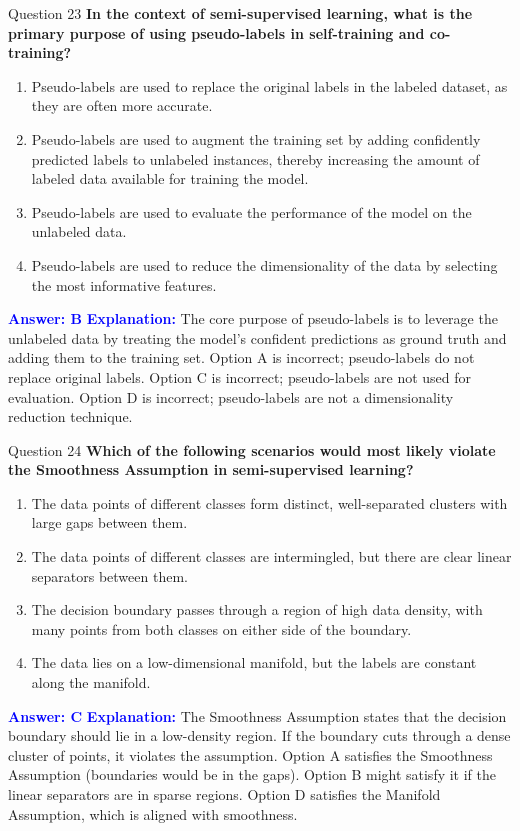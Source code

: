 \documentclass[8pt]{beamer}  %
\begin{document}
	\begin{frame}{Question 23}
		\textbf{In the context of semi-supervised learning, what is the primary purpose of using pseudo-labels in self-training and co-training?}
		\begin{enumerate}
			\item Pseudo-labels are used to replace the original labels in the labeled dataset, as they are often more accurate.
			\item Pseudo-labels are used to augment the training set by adding confidently predicted labels to unlabeled instances, thereby increasing the amount of labeled data available for training the model.
			\item Pseudo-labels are used to evaluate the performance of the model on the unlabeled data.
			\item Pseudo-labels are used to reduce the dimensionality of the data by selecting the most informative features.
		\end{enumerate}
		\vspace{0.2cm}
		\textcolor{blue}{\textbf{Answer: B}}
		\vspace{0.2cm}
		\textcolor{blue}{\textbf{Explanation:}} The core purpose of pseudo-labels is to leverage the unlabeled data by treating the model's confident predictions as ground truth and adding them to the training set. Option A is incorrect; pseudo-labels do not replace original labels. Option C is incorrect; pseudo-labels are not used for evaluation. Option D is incorrect; pseudo-labels are not a dimensionality reduction technique.
	\end{frame}
	
	\begin{frame}{Question 24}
		\textbf{Which of the following scenarios would most likely violate the Smoothness Assumption in semi-supervised learning?}
		\begin{enumerate}
			\item The data points of different classes form distinct, well-separated clusters with large gaps between them.
			\item The data points of different classes are intermingled, but there are clear linear separators between them.
			\item The decision boundary passes through a region of high data density, with many points from both classes on either side of the boundary.
			\item The data lies on a low-dimensional manifold, but the labels are constant along the manifold.
		\end{enumerate}
		\vspace{0.2cm}
		\textcolor{blue}{\textbf{Answer: C}}
		\vspace{0.2cm}
		\textcolor{blue}{\textbf{Explanation:}} The Smoothness Assumption states that the decision boundary should lie in a low-density region. If the boundary cuts through a dense cluster of points, it violates the assumption. Option A satisfies the Smoothness Assumption (boundaries would be in the gaps). Option B might satisfy it if the linear separators are in sparse regions. Option D satisfies the Manifold Assumption, which is aligned with smoothness.
	\end{frame}
	
\end{document}
